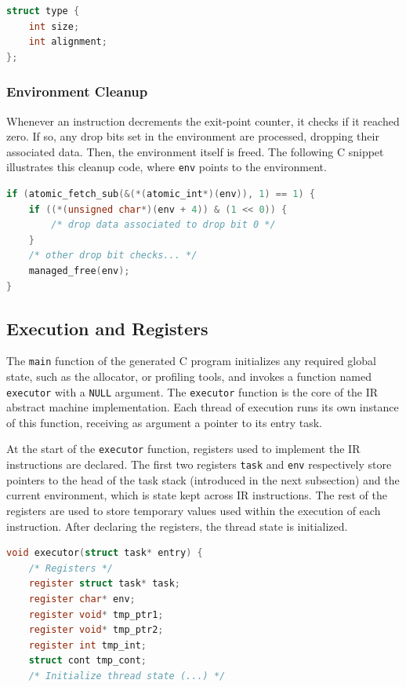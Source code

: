 \begin{lstlisting}[language=C, frame=bottom]
struct type {
    int size;
    int alignment;
};
\end{lstlisting}

\subsubsection{Environment Cleanup} \label{subsubsection:CEnvironmentCleanup}

Whenever an instruction decrements the exit-point counter, it checks if it reached zero. If so, any drop bits set in the environment are processed, dropping their associated data. Then, the environment itself is freed. The following C snippet illustrates this cleanup code, where \texttt{env} points to the environment.

\begin{lstlisting}[language=C, frame=bottom]
if (atomic_fetch_sub(&(*(atomic_int*)(env)), 1) == 1) {
    if ((*(unsigned char*)(env + 4)) & (1 << 0)) {
        /* drop data associated to drop bit 0 */
    }
    /* other drop bit checks... */
    managed_free(env);
}
\end{lstlisting}

\subsection{Execution and Registers}

The \texttt{main} function of the generated C program initializes any required global state, such as the allocator, or profiling tools, and invokes a function named \texttt{executor} with a \texttt{NULL} argument. The \texttt{executor} function is the core of the \ac{IR} abstract machine implementation. Each thread of execution runs its own instance of this function, receiving as argument a pointer to its entry task.

At the start of the \texttt{executor} function, registers used to implement the \ac{IR} instructions are declared. The first two registers \texttt{task} and \texttt{env} respectively store pointers to the head of the task stack (introduced in the next subsection) and the current environment, which is state kept across \ac{IR} instructions. The rest of the registers are used to store temporary values used within the execution of each instruction. After declaring the registers, the thread state is initialized.

\begin{lstlisting}[language=C, frame=bottom]
void executor(struct task* entry) {
    /* Registers */
    register struct task* task;
    register char* env;
    register void* tmp_ptr1;
    register void* tmp_ptr2;
    register int tmp_int;
    struct cont tmp_cont;
    /* Initialize thread state (...) */
\end{lstlisting}

